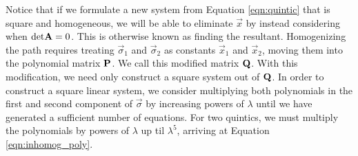 \documentclass[oneside, 11pt]{book}
\begin{document}
Notice that if we formulate a new system from Equation \ref{eqn:quintic} that is square and homogeneous, we will be able to eliminate $\vec{x}$ by instead considering when $\text{det}\mathbf{A}=0$. This is otherwise known as finding the resultant\cite{Sederberg84}. Homogenizing the path requires treating $\vec{\sigma}_1$ and $\vec{\sigma}_2$ as constants $\vec{x}_1$ and $\vec{x}_2$, moving them into the polynomial matrix $\mathbf{P}$. We call this modified matrix $\mathbf{Q}$. With this modification, we need only construct a square system out of $\mathbf{Q}$. In order to construct a square linear system, we consider multiplying both polynomials in the first and second component of $\vec{\sigma}$ by increasing powers of $\lambda$ until we have generated a sufficient number of equations. For two quintics, we must multiply the polynomials by powers of $\lambda$ up til $\lambda^5$, arriving at Equation \ref{eqn:inhomog_poly}.
\end{document}
